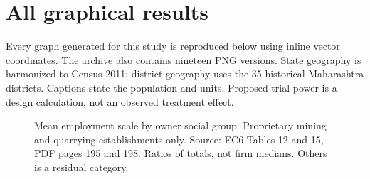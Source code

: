 \documentclass[11pt,a4paper]{report}
\begin{document}
\chapter{All graphical results}
Every graph generated for this study is reproduced below using inline vector coordinates. The archive also contains nineteen PNG versions. State geography is harmonized to Census 2011; district geography uses the 35 historical Maharashtra districts. Captions state the population and units. Proposed trial power is a design calculation, not an observed treatment effect.
\clearpage\begin{figure}[p]\centering
{}

\caption{Mean employment scale by owner social group. Proprietary mining and quarrying establishments only. Source: EC6 Tables 12 and 15, PDF pages 195 and 198. Ratios of totals, not firm medians. Others is a residual category.}\end{figure}\clearpage
\end{document}
